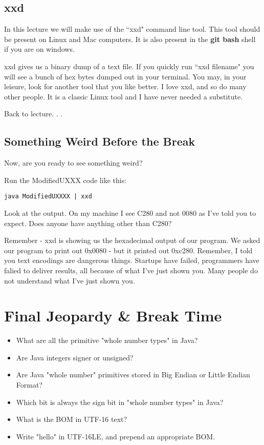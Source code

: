 \documentclass[12pt]{article}
\begin{document}
\subsection{xxd}
In this lecture we will make use of the ``xxd" command line tool. This tool should be present on Linux and Mac computers. It is also present in the \textbf{git bash} shell if you are on windows.

xxd gives us a binary dump of a text file. If you quickly run ``xxd filename" you will see a bunch of hex bytes dumped out in your terminal. You may, in your leisure, look for another tool that you like better. I love xxd, and so do many other people. It is a classic Linux tool and I have never needed a substitute. 

Back to lecture. . .


\subsection{Something Weird Before the Break}
Now, are you ready to see something weird? 

Run the ModifiedUXXX code like this:

\begin{lstlisting}
java ModifiedUXXXX | xxd
\end{lstlisting}

Look at the output. On my machine I see C280 and not 0080 as I've told you to expect. Does anyone have anything other than C280?

Remember - xxd is showing us the hexadecimal output of our program. We asked our program to print out 0x0080 - but it printed out 0xc280. Remember, I told you text encodings are dangerous things. Startups have failed, programmers have falied to deliver results, all because of what I've just shown you. Many people do not understand what I've just shown you.

\section{Final Jeopardy \& Break Time}
\begin{itemize}
\item What are all the primitive "whole number types" in Java?
\item Are Java integers signer or unsigned?
\item Are Java "whole number" primitives stored in Big Endian or Little Endian Format?
\item Which bit is always the sign bit in "whole number types" in Java?\item What is the BOM in UTF-16 text?
\item Write "hello" in UTF-16LE, and prepend an appropriate BOM.
\end{itemize}
\end{document}
